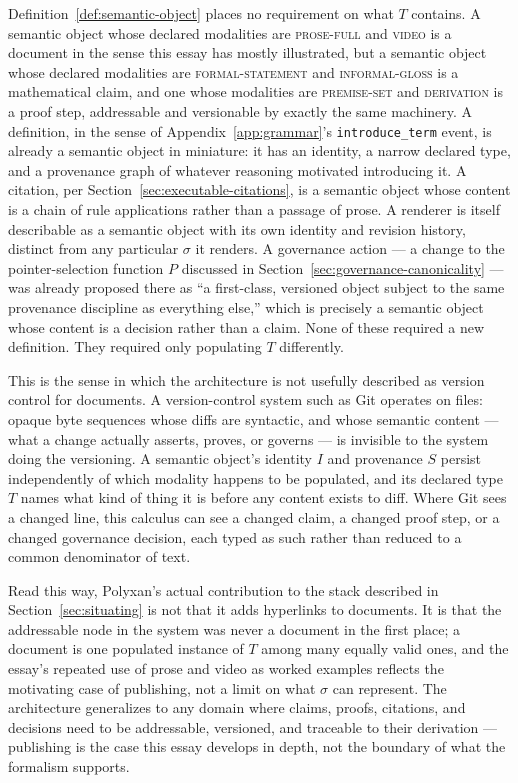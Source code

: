\documentclass[11pt]{article}
\theoremstyle{definition}
\begin{document}
Definition~\ref{def:semantic-object} places no requirement on what $T$ contains. A semantic object whose declared modalities are \textsc{prose-full} and \textsc{video} is a document in the sense this essay has mostly illustrated, but a semantic object whose declared modalities are \textsc{formal-statement} and \textsc{informal-gloss} is a mathematical claim, and one whose modalities are \textsc{premise-set} and \textsc{derivation} is a proof step, addressable and versionable by exactly the same machinery. A definition, in the sense of Appendix~\ref{app:grammar}'s \texttt{introduce\_term} event, is already a semantic object in miniature: it has an identity, a narrow declared type, and a provenance graph of whatever reasoning motivated introducing it. A citation, per Section~\ref{sec:executable-citations}, is a semantic object whose content is a chain of rule applications rather than a passage of prose. A renderer is itself describable as a semantic object with its own identity and revision history, distinct from any particular $\sigma$ it renders. A governance action --- a change to the pointer-selection function $P$ discussed in Section~\ref{sec:governance-canonicality} --- was already proposed there as ``a first-class, versioned object subject to the same provenance discipline as everything else,'' which is precisely a semantic object whose content is a decision rather than a claim. None of these required a new definition. They required only populating $T$ differently.

This is the sense in which the architecture is not usefully described as version control for documents. A version-control system such as Git operates on files: opaque byte sequences whose diffs are syntactic, and whose semantic content --- what a change actually asserts, proves, or governs --- is invisible to the system doing the versioning. A semantic object's identity $I$ and provenance $S$ persist independently of which modality happens to be populated, and its declared type $T$ names what kind of thing it is before any content exists to diff. Where Git sees a changed line, this calculus can see a changed claim, a changed proof step, or a changed governance decision, each typed as such rather than reduced to a common denominator of text.

Read this way, Polyxan's actual contribution to the stack described in Section~\ref{sec:situating} is not that it adds hyperlinks to documents. It is that the addressable node in the system was never a document in the first place; a document is one populated instance of $T$ among many equally valid ones, and the essay's repeated use of prose and video as worked examples reflects the motivating case of publishing, not a limit on what $\sigma$ can represent. The architecture generalizes to any domain where claims, proofs, citations, and decisions need to be addressable, versioned, and traceable to their derivation --- publishing is the case this essay develops in depth, not the boundary of what the formalism supports.
\end{document}
